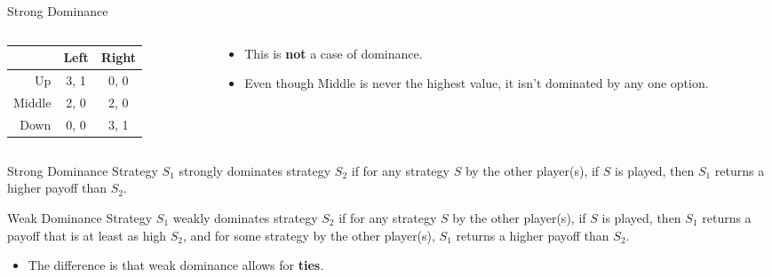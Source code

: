 \documentclass[
  14pt,
  letterpaper,
  ignorenonframetext,
  aspectratio=169,
  handout]{beamer}
\providecommand{\tightlist}{%
  \setlength{\itemsep}{0pt}\setlength{\parskip}{0pt}}\usepackage{longtable,booktabs,array}
\let\olditem\item
\renewcommand{\item}{%
\olditem\vspace{6pt}}
\begin{document}
\begin{frame}[fragile]{Strong Dominance}
\protect\hypertarget{strong-dominance-2}{}
\begin{columns}[T]
\begin{column}{0.4\textwidth}
\begin{table}[!h]
\centering
\begin{tabular}[t]{>{}r|cc}
\toprule
 & Left & Right\\
\midrule
Up & 3, 1 & 0, 0\\
Middle & 2, 0 & 2, 0\\
Down & 0, 0 & 3, 1\\
\bottomrule
\end{tabular}
\end{table}
\end{column}

\begin{column}{0.6\textwidth}
\begin{itemize}[<+->]
\tightlist
\item
  This is \textbf{not} a case of dominance.
\item
  Even though Middle is never the highest value, it isn't dominated by
  any one option.
\end{itemize}
\end{column}
\end{columns}
\end{frame}

\begin{frame}{Strong Dominance}
\protect\hypertarget{strong-dominance-3}{}
Strategy \(S_1\) strongly dominates strategy \(S_2\) if for any strategy
\(S\) by the other player(s), if \(S\) is played, then \(S_1\) returns a
higher payoff than \(S_2\).
\end{frame}

\begin{frame}{Weak Dominance}
\protect\hypertarget{weak-dominance}{}
Strategy \(S_1\) weakly dominates strategy \(S_2\) if for any strategy
\(S\) by the other player(s), if \(S\) is played, then \(S_1\) returns a
payoff that is at least as high \(S_2\), and for some strategy by the
other player(s), \(S_1\) returns a higher payoff than \(S_2\).

\begin{itemize}[<+->]
\tightlist
\item
  The difference is that weak dominance allows for \textbf{ties}.
\end{itemize}
\end{frame}
\end{document}
